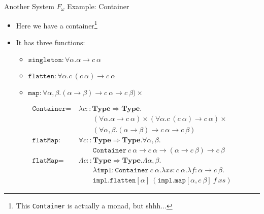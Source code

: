 \documentclass[leqno,presentation,usenames,dvipsnames]{beamer}
\newcommand{\Type}{\textbf{Type}}
\begin{document}
\begin{frame}[fragile]{Another System $F_\omega$ Example: Container}
    \begin{itemize}
        \item Here we have a container\footnote{This \texttt{Container} is actually a monad, but shhh...}
        \item It has three functions:
            \begin{itemize}
                \item $\texttt{singleton} : \forall \alpha. \alpha \to c~\alpha$
                \item $\texttt{flatten} : \forall \alpha. c~(c~\alpha) \to c~\alpha$
                \item $\texttt{map} : \forall \alpha,\beta. (\alpha \to \beta) \to c~\alpha \to c~\beta) \times$
            \end{itemize}
    \end{itemize}
    \footnotesize
    \begin{align*}
        \texttt{Container} = &~\lambda c :: \Type \Rightarrow \Type. \\
                             &~\qquad(\forall \alpha. \alpha \to c~\alpha) \times (\forall \alpha. c~(c~\alpha) \to c~\alpha) \times \\
                             &~\qquad(\forall \alpha,\beta. (\alpha \to \beta) \to c~\alpha \to c~\beta) \\
        \texttt{flatMap} :&~ \forall c :: \Type \Rightarrow \Type. \forall \alpha, \beta. \\
                          &~\qquad \texttt{Container}~c~\alpha \to c~\alpha \to (\alpha \to c~\beta) \to c~\beta \\
        \texttt{flatMap} =&~ \Lambda c :: \Type \Rightarrow \Type. \Lambda \alpha, \beta. \\
                          &~\qquad \lambda \texttt{impl} : \texttt{Container}~c~\alpha. \lambda xs : c~\alpha. \lambda f : \alpha \to c~\beta. \\
                          &~\qquad \texttt{impl.flatten}[\alpha]~(\texttt{impl.map}[\alpha,c~\beta]~f~xs)
    \end{align*}
\end{frame}
\end{document}
